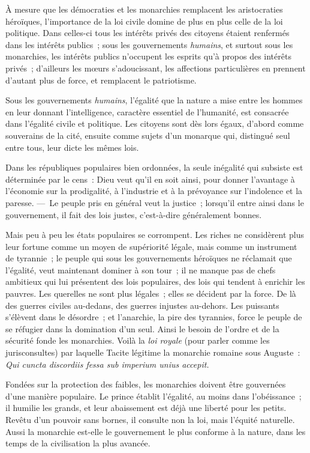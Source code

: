 \documentclass[french,twoside]{book} %
\begin{document}
À mesure que les démocraties et les monarchies remplacent les aristocraties héroïques, l’importance de la loi civile domine de plus en plus celle de la loi politique. Dans celles-ci tous les intérêts privés des citoyens étaient renfermés dans les intérêts publics ; sous les gouvernements {\itshape humains}, et surtout sous les monarchies, les intérêts publics n’occupent  les esprits qu’à propos des intérêts privés ; d’ailleurs les mœurs s’adoucissant, les affections particulières en prennent d’autant plus de force, et remplacent le patriotisme.\par
Sous les gouvernements {\itshape humains}, l’égalité que la nature a mise entre les hommes en leur donnant l’intelligence, caractère essentiel de l’humanité, est consacrée dans l’égalité civile et politique. Les citoyens sont dès lors égaux, d’abord comme souverains de la cité, ensuite comme sujets d’un monarque qui, distingué seul entre tous, leur dicte les mêmes lois.\par
Dans les républiques populaires bien ordonnées, la seule inégalité qui subsiste est déterminée par le cens : Dieu veut qu’il en soit ainsi, pour donner l’avantage à l’économie sur la prodigalité, à l’industrie et à la prévoyance sur l’indolence et la paresse. — Le peuple pris en général veut la justice ; lorsqu’il entre ainsi dans le gouvernement, il fait des lois justes, c’est-à-dire généralement bonnes.\par
Mais peu à peu les états populaires se corrompent. Les riches ne considèrent plus leur fortune comme un moyen de supériorité légale, mais comme un instrument de tyrannie ; le peuple qui sous les gouvernements héroïques ne réclamait que l’égalité, veut maintenant dominer à son tour ; il ne manque pas de chefs ambitieux qui lui présentent des lois  populaires, des lois qui tendent à enrichir les pauvres. Les querelles ne sont plus légales ; elles se décident par la force. De là des guerres civiles au-dedans, des guerres injustes au-dehors. Les puissants s’élèvent dans le désordre ; et l’anarchie, la pire des tyrannies, force le peuple de se réfugier dans la domination d’un seul. Ainsi le besoin de l’ordre et de la sécurité fonde les monarchies. Voilà la {\itshape loi royale} (pour parler comme les jurisconsultes) par laquelle Tacite légitime la monarchie romaine sous Auguste : \emph{{\itshape Qui cuncta discordiis fessa sub imperium unius accepit.}}\par
Fondées sur la protection des faibles, les monarchies doivent être gouvernées d’une manière populaire. Le prince établit l’égalité, au moins dans l’obéissance ; il humilie les grands, et leur abaissement est déjà une liberté pour les petits. Revêtu d’un pouvoir sans bornes, il consulte non la loi, mais l’équité naturelle. Aussi la monarchie est-elle le gouvernement le plus conforme à la nature, dans les temps de la civilisation la plus avancée.\par
\end{document}
